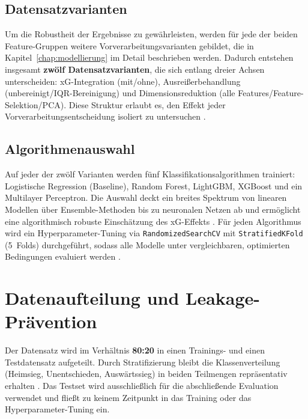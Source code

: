 \subsection{Datensatzvarianten}

Um die Robustheit der Ergebnisse zu gewährleisten, werden für jede der
beiden Feature-Gruppen weitere Vorverarbeitungsvarianten gebildet, die
in Kapitel~\ref{chap:modellierung} im Detail beschrieben werden.
Dadurch entstehen insgesamt \textbf{zwölf Datensatzvarianten}, die sich
entlang dreier Achsen unterscheiden: xG-Integration (mit/ohne),
Ausreißerbehandlung (unbereinigt/IQR-Bereinigung) und Dimensionsreduktion
(alle Features/Feature-Selektion/PCA). Diese Struktur erlaubt es, den
Effekt jeder Vorverarbeitungsentscheidung isoliert zu untersuchen
\cite{BunkerThabtah2019}.

\subsection{Algorithmenauswahl}

Auf jeder der zwölf Varianten werden fünf Klassifikationsalgorithmen
trainiert: Logistische Regression (Baseline), Random Forest, LightGBM,
XGBoost und ein Multilayer Perceptron. Die Auswahl deckt ein breites
Spektrum von linearen Modellen über Ensemble-Methoden bis zu neuronalen
Netzen ab und ermöglicht eine algorithmisch robuste Einschätzung des
xG-Effekts \cite{BunkerThabtah2019,GrollLeyEffenberger2019}. Für jeden
Algorithmus wird ein Hyperparameter-Tuning via \texttt{RandomizedSearchCV}
mit \texttt{StratifiedKFold} (5~Folds) durchgeführt, sodass alle Modelle
unter vergleichbaren, optimierten Bedingungen evaluiert werden
\cite{JamesEtAl2021}.

\section{Datenaufteilung und Leakage-Prävention}
\label{sec:split}

Der Datensatz wird im Verhältnis \textbf{80:20} in einen Trainings- und
einen Testdatensatz aufgeteilt. Durch Stratifizierung bleibt die
Klassenverteilung (Heimsieg, Unentschieden, Auswärtssieg) in beiden
Teilmengen repräsentativ erhalten \cite{JamesEtAl2021}. Das Testset wird
ausschließlich für die abschließende Evaluation verwendet und fließt zu
keinem Zeitpunkt in das Training oder das Hyperparameter-Tuning ein.

